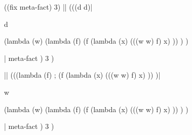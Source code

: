 \begin{code:lisp}
((fix meta-fact) 3)
|\Equals|   (((d d)|\begin{where}
                    \- d {\eq} \begin{complex}
                              \-(lambda (w)
                              \-  (lambda (f)
                              \-   (f (lambda (x)
                              \-        (((w w) f) x) )) ) )
                              \end{complex}
                    \end{where}|
     meta-fact )
    3 )

|\Equals|   (((lambda (f)               ; 
       (f (lambda (x)
            (((w w) f) x) )) )|\begin{where}
                               \- w {\eq} \begin{complex}
                                         \-(lambda (w)
                                         \-  (lambda (f)
                                         \-   (f (lambda (x)
                                         \-        (((w w) f) x) )) ) )
                                         \end{complex}
                              \end{where}|
     meta-fact )
    3 )


\end{code:lisp}
